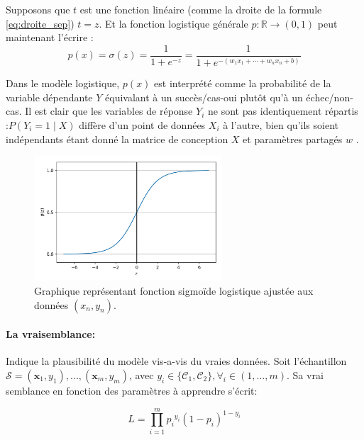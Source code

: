 	Supposons que $t$ est une fonction linéaire (comme la droite de la formule \ref{eq:droite_sep}) $t = z$. Et la fonction logistique générale ${ p:\mathbb {R} \rightarrow (0,1)}$ peut maintenant l'écrire :
	\begin{equation}\label{eq:sigmoid-dev}
	{\displaystyle p(x)=\sigma (z)= {\frac {1}{1+e^{-z}}} ={\frac {1}{1+e^{-(w _{1}x_{1}+\cdots +w_{n}x_{n}+b)}}}}
	\end{equation} 
	
	
	
	Dans le modèle logistique, $p(x)$ est interprété comme la probabilité de la variable dépendante ${Y}$ équivalant à un succès/cas-oui plutôt qu'à un échec/non-cas. Il est clair que les variables de réponse $Y_{i}$ ne sont pas identiquement répartis :$P(Y_{i}=1\mid X)$ diffère d'un point de données $X_{i}$ à l'autre, bien qu'ils soient indépendants étant donné la matrice de conception $X$ et paramètres partagés $w$ \cite{antoine2018apprentissage}. 
	
	
	\begin{figure}[H]%
		\centering
		\includegraphics[width=7cm]{images/reg_log_curve.png}
		\caption[Graphique représentant fonction logistique.]{Graphique représentant fonction sigmoïde logistique ajustée aux données $(x_n , y_n)$. \cite{ml2008python}}
		\label{fig:reg_log_sigmoid}
	\end{figure}
	
	\paragraph*{La vraisemblance:}Indique la plausibilité du  modèle vis-a-vis du vraies données.
	Soit l'échantillon $ \mathcal{S} = {(\mathbf{x}_1, y_1),..., (\mathbf{x}_m, y_m)}$, avec $y_i \in \{\mathcal{C}_1,\mathcal{C}_2\}, \forall_i \in (1,...,m)$. Sa vrai semblance en fonction des paramètres à apprendre s'écrit:
	
	\begin{equation}\label{eq:likelyhood}
	L = \prod_{i=1}^{m} {p_i}^{y_i} (1-p_i)^{1-y_i}
	\end{equation}
	
